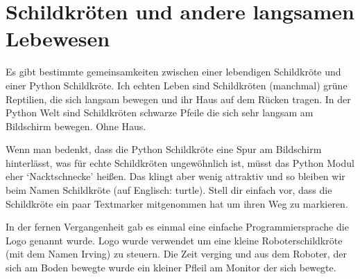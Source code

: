 

\chapter{Schildkröten und andere langsamen Lebewesen}\label{ch:turtles}

Es gibt bestimmte gemeinsamkeiten zwischen einer lebendigen Schildkröte und einer Python Schildkröte. Ich echten Leben sind Schildkröten (manchmal) grüne Reptilien, die sich langsam bewegen und ihr Haus auf dem Rücken tragen. In der Python Welt sind Schildkröten schwarze Pfeile die sich sehr langsam am Bildschirm bewegen. Ohne Haus.

Wenn man bedenkt, dass die Python Schildkröte eine Spur am Bildschirm hinterlässt, was für echte Schildkröten ungewöhnlich ist, müsst das Python Modul eher `Nacktschnecke' heißen. Das klingt aber wenig attraktiv und so bleiben wir beim Namen Schildkröte (auf Englisch: turtle). Stell dir einfach vor, dass die Schildkröte ein paar Textmarker mitgenommen hat um ihren Weg zu markieren.

In der fernen Vergangenheit gab es einmal eine einfache Programmiersprache die Logo genannt wurde. Logo wurde verwendet um eine kleine Roboterschildkröte (mit dem Namen Irving) zu steuern. Die Zeit verging und aus dem Roboter, der sich am Boden bewegte wurde ein kleiner Pfleil am Monitor der sich bewegte.

